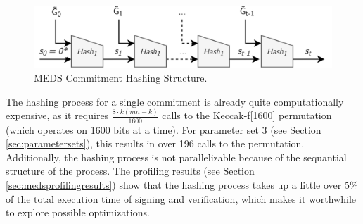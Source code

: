 \documentclass[11pt,a4paper]{report}
\theoremstyle{definition}
\begin{document}
\begin{figure}
  \centering
  \includegraphics[width=\textwidth]{hash/hash_struct_seq.png}
  \caption{MEDS Commitment Hashing Structure.}
  \label{fig:hashstructure}
\end{figure}

The hashing process for a single commitment is already quite computationally expensive, as it requires $\frac{8 \cdot k(mn-k)}{1600}$ calls to the Keccak-f[1600] permutation (which operates on 1600 bits at a time). For parameter set 3 (see Section \ref{sec:parametersets}), this results in over 196 calls to the permutation. Additionally, the hashing process is not parallelizable because of the sequantial structure of the process. The profiling results (see Section \ref{sec:medsprofilingresults}) show that the hashing process takes up a little over 5\% of the total execution time of signing and verification, which makes it worthwhile to explore possible optimizations.
\end{document}
